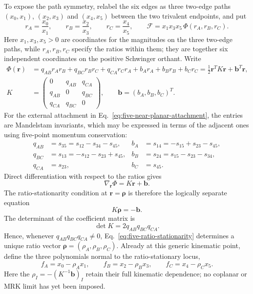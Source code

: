 \documentclass[a4paper,11pt]{article}
\begin{document}
To expose the path symmetry, relabel the six edges as three two-edge paths
\((x_0,x_1)\), \((x_2,x_3)\) and \((x_4,x_5)\) between the two trivalent
endpoints, and put
\begin{equation}
 r_A=\frac{x_0}{x_1},\qquad r_B=\frac{x_2}{x_3},\qquad
 r_C=\frac{x_4}{x_5},\qquad
 \mathcal F=x_1x_3x_5\,\Phi(r_A,r_B,r_C).
 \label{eq:five-path-ratios}
\end{equation}
Here \(x_1,x_3,x_5>0\) are coordinates for the magnitudes on the three
two-edge paths, while \(r_A,r_B,r_C\) specify the ratios within them; they
are together six independent coordinates on the positive Schwinger
orthant.  Write
\begin{align}
 \Phi(\boldsymbol r)&=q_{AB}r_Ar_B+q_{BC}r_Br_C
 +q_{CA}r_Cr_A+b_A r_A+b_B r_B+b_C r_C
 =\frac12\boldsymbol r^T K\boldsymbol r+\boldsymbol b^T\boldsymbol r,
 \nonumber\\
 K&=\begin{pmatrix}
 0&q_{AB}&q_{CA}\\ q_{AB}&0&q_{BC}\\ q_{CA}&q_{BC}&0
 \end{pmatrix},
 \qquad \boldsymbol b=(b_A,b_B,b_C)^T.
 \label{eq:five-ratio-quadratic}
\end{align}
For the external attachment in Eq.~\eqref{eq:five-near-planar-attachment},
the entries are Mandelstam invariants, which may be expressed in terms of
the adjacent ones using five-point momentum conservation:
\begin{align}
 q_{AB}&=s_{35}=s_{12}-s_{34}-s_{45},
 &b_A&=s_{14}=-s_{15}+s_{23}-s_{45},\nonumber\\
 q_{BC}&=s_{13}=-s_{12}-s_{23}+s_{45},
 &b_B&=s_{24}=s_{15}-s_{23}-s_{34},\nonumber\\
 q_{CA}&=s_{23},
 &b_C&=s_{45}.
 \label{eq:five-ratio-coefficients}
\end{align}
Direct differentiation with respect to the ratios gives
\begin{equation}
 \nabla_{\boldsymbol r}\Phi=K\boldsymbol r+\boldsymbol b.
 \label{eq:five-ratio-gradient}
\end{equation}
The ratio-stationarity condition at \(\boldsymbol r=\boldsymbol\rho\) is
therefore the logically separate equation
\begin{equation}
 K\boldsymbol\rho=-\boldsymbol b.
 \label{eq:five-ratio-stationarity}
\end{equation}
The determinant of the coefficient matrix is
\begin{equation}
 \det K=2q_{AB}q_{BC}q_{CA}.
 \label{eq:five-ratio-determinant}
\end{equation}
Hence, whenever \(q_{AB}q_{BC}q_{CA}\ne0\), Eq.~\eqref{eq:five-ratio-stationarity}
determines a unique ratio vector
\(\boldsymbol\rho=(\rho_A,\rho_B,\rho_C)\).
Already at this generic kinematic point, define the three polynomials normal
to the ratio-stationary locus,
\begin{equation}
 f_A=x_0-\rho_Ax_1,\qquad f_B=x_2-\rho_Bx_3,
 \qquad f_C=x_4-\rho_Cx_5.
 \label{eq:five-path-normals}
\end{equation}
Here the \(\rho_I=-\left(K^{-1}\boldsymbol b\right)_I\) retain their full
kinematic dependence; no coplanar or MRK limit has yet been imposed.
\end{document}
